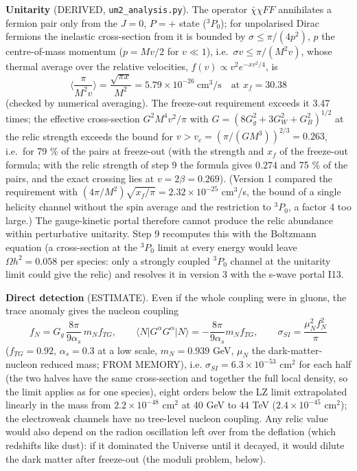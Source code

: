 \documentclass[
  10pt,
]{article}
\begin{document}
\textbf{Unitarity} (DERIVED, \texttt{um2\_analysis.py}). The operator
\(\bar\chi\chi FF\) annihilates a fermion pair only from the \(J = 0\),
\(P = +\) state (\(^3P_0\)); for unpolarised Dirac fermions the
inelastic cross-section from it is bounded by \(\sigma \le \pi/(4p^2)\),
\(p\) the centre-of-mass momentum (\(p = Mv/2\) for \(v \ll 1\)),
i.e.~\(\sigma v \le \pi/(M^2v)\), whose thermal average over the
relative velocities, \(f(v) \propto v^2e^{-xv^2/4}\), is
\[ \Big\langle\frac{\pi}{M^2v}\Big\rangle = \frac{\sqrt{\pi x}}{M^2} = 5.79\times10^{-26}\ \text{cm}^3/\text{s}\quad \text{at } x_f = 30.38 \]
(checked by numerical averaging). The freeze-out requirement exceeds it
3.47 times; the effective cross-section \(G^2M^4v^2/\pi\) with
\(G = (8G_g^2 + 3G_W^2 + G_B^2)^{1/2}\) at the relic strength exceeds
the bound for \(v > v_c = (\pi/(GM^3))^{2/3} = 0.263\), i.e.~for 79 \%
of the pairs at freeze-out (with the strength and \(x_f\) of the
freeze-out formula; with the relic strength of step 9 the formula gives
\(0.274\) and 75 \% of the pairs, and the exact crossing lies at
\(v = 2\beta = 0.269\)). (Version 1 compared the requirement with
\((4\pi/M^2)\sqrt{x_f/\pi} = 2.32\times10^{-25}\) cm\(^3\)/s, the bound
of a single helicity channel without the spin average and the
restriction to \(^3P_0\), a factor 4 too large.) The gauge-kinetic
portal therefore cannot produce the relic abundance within perturbative
unitarity. Step 9 recomputes this with the Boltzmann equation (a
cross-section at the \(^3P_0\) limit at every energy would leave
\(\Omega h^2 = 0.058\) per species: only a strongly coupled \(^3P_0\)
channel at the unitarity limit could give the relic) and resolves it in
version 3 with the s-wave portal I13.

\textbf{Direct detection} (ESTIMATE). Even if the whole coupling were in
gluons, the trace anomaly gives the nucleon coupling
\[ f_N = G_g\,\frac{8\pi}{9\alpha_s}\,m_Nf_{TG},\qquad \langle N\vert G^\alpha G^\alpha\vert N\rangle = -\frac{8\pi}{9\alpha_s}m_Nf_{TG},\qquad \sigma_{SI} = \frac{\mu_N^2f_N^2}{\pi} \]
(\(f_{TG} = 0.92\), \(\alpha_s = 0.3\) at a low scale, \(m_N = 0.939\)
GeV, \(\mu_N\) the dark-matter-nucleon reduced mass; FROM MEMORY), i.e.
\(\sigma_{SI} = 6.3\times10^{-53}\) cm\(^2\) for each half (the two
halves have the same cross-section and together the full local density,
so the limit applies as for one species), eight orders below the LZ
limit extrapolated linearly in the mass from \(2.2\times10^{-48}\)
cm\(^2\) at 40 GeV to \(44\) TeV (\(2.4\times10^{-45}\) cm\(^2\)); the
electroweak channels have no tree-level nucleon coupling. Any relic
value would also depend on the radion oscillation left over from the
deflation (which redshifts like dust): if it dominated the Universe
until it decayed, it would dilute the dark matter after freeze-out (the
moduli problem, below).
\end{document}
